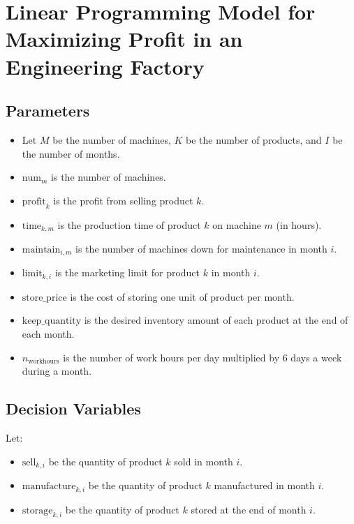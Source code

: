\documentclass{article}
\begin{document}
\section*{Linear Programming Model for Maximizing Profit in an Engineering Factory}

\subsection*{Parameters}
\begin{itemize}
    \item Let \( M \) be the number of machines, \( K \) be the number of products, and \( I \) be the number of months.
    \item \( \text{num}_m \) is the number of machines.
    \item \( \text{profit}_k \) is the profit from selling product \( k \).
    \item \( \text{time}_{k, m} \) is the production time of product \( k \) on machine \( m \) (in hours).
    \item \( \text{maintain}_{i, m} \) is the number of machines down for maintenance in month \( i \).
    \item \( \text{limit}_{k, i} \) is the marketing limit for product \( k \) in month \( i \).
    \item \( \text{store\_price} \) is the cost of storing one unit of product per month.
    \item \( \text{keep\_quantity} \) is the desired inventory amount of each product at the end of each month.
    \item \( n_{\text{workhours}} \) is the number of work hours per day multiplied by 6 days a week during a month.
\end{itemize}

\subsection*{Decision Variables}
Let:
\begin{itemize}
    \item \( \text{sell}_{k, i} \) be the quantity of product \( k \) sold in month \( i \).
    \item \( \text{manufacture}_{k, i} \) be the quantity of product \( k \) manufactured in month \( i \).
    \item \( \text{storage}_{k, i} \) be the quantity of product \( k \) stored at the end of month \( i \).
\end{itemize}
\end{document}
